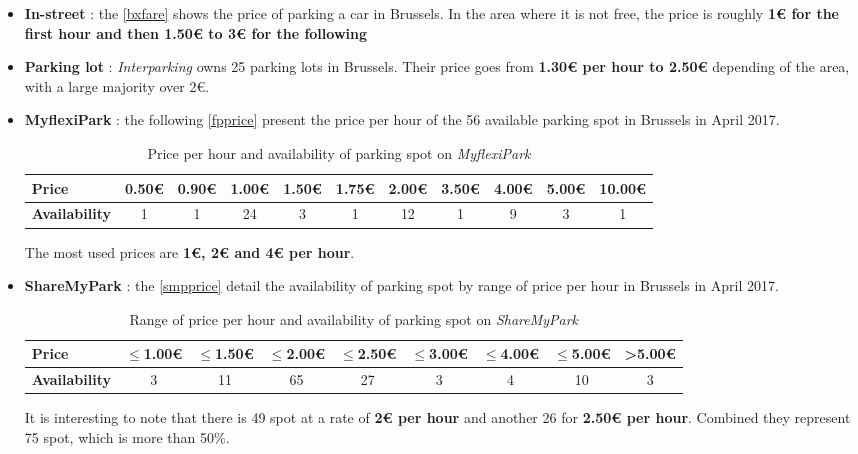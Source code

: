 \documentclass[12pt,a4paper,oneside]{book}
\begin{document}
\begin{itemize}
\item \textbf{In-street} : the \autoref{bxfare} shows the price of parking a car in Brussels. In the area where it is not free, the price is roughly \textbf{1\euro{} for the first hour and then 1.50\euro{} to 3\euro{} for the following}
\item \textbf{Parking lot} : \textit{Interparking} owns 25 parking lots in Brussels. Their price goes from \textbf{1.30\euro{} per hour to 2.50\euro{}} depending of the area, with a large majority over 2\euro{}.\cite{interpk}
\item \textbf{MyflexiPark} : the following \autoref{fpprice} present the price per hour of the 56 available parking spot in Brussels in April 2017.

\begin{table}[h]
\centering
\caption{Price per hour and availability of parking spot on \textit{MyflexiPark}}
\label{fpprice}
\begin{adjustbox}{center}
\begin{tabular}{@{}lcccccccccc@{}}
\toprule
\textbf{Price}  & 0.50\euro{} & 0.90\euro{} & 1.00\euro{} & 1.50\euro{} & 1.75\euro{} & 2.00\euro{} & 3.50\euro{} & 4.00\euro{} & 5.00\euro{} & 10.00\euro{} \\ \midrule
\textbf{Availability} & 1           & 1           & 24          & 3           & 1           & 12          & 1           & 9           & 3           & 1            \\ \bottomrule
\end{tabular}
\end{adjustbox}
\end{table}

The most used prices are \textbf{1\euro{}, 2\euro{} and 4\euro{} per hour}.

\item \textbf{ShareMyPark} : the \autoref{smpprice} detail the availability of parking spot by range of price per hour in Brussels in April 2017.

\begin{table}[h]
\centering
\caption{Range of price per hour and availability of parking spot on \textit{ShareMyPark}}
\label{smpprice}
\begin{adjustbox}{center}
\begin{tabular}{@{}lcccccccc@{}}
\toprule
\textbf{Price}       & $\leq$1.00\euro{} & $\leq$1.50\euro{} & $\leq$2.00\euro{} & $\leq$2.50\euro{} & $\leq$3.00\euro{} & $\leq$4.00\euro{} & $\leq$5.00\euro{} & >5.00\euro{} \\ \midrule
\textbf{Availability} & 3            & 11           & 65           & 27           & 3            & 4            & 10           & 3           \\\bottomrule
\end{tabular}
\end{adjustbox}
\end{table}

It is interesting to note that there is 49 spot at a rate of \textbf{2\euro{} per hour} and another 26 for \textbf{2.50\euro{} per hour}. Combined they represent 75 spot, which is more than 50\%.
\end{itemize}
\end{document}
